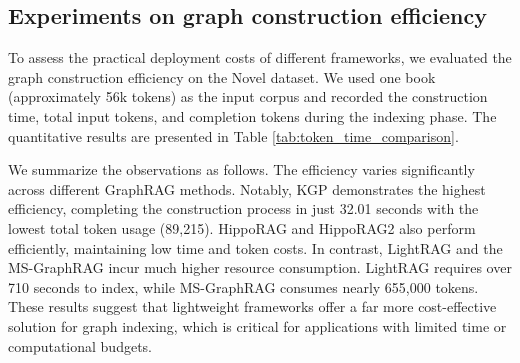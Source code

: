 \documentclass{article} %
\begin{document}
\begin{table}[t]
\centering
\caption{Construction time and all token usage during the indexing phase across different GraphRAG.}
\scriptsize
\label{tab:token_time_comparison}
\end{table}

\subsection{Experiments on graph construction efficiency}\label{sec:appendix_experiment_efficiency}
To assess the practical deployment costs of different frameworks, we evaluated the graph construction efficiency on the Novel dataset. We used one book (approximately 56k tokens) as the input corpus and recorded the construction time, total input tokens, and completion tokens during the indexing phase. The quantitative results are presented in Table \ref{tab:token_time_comparison}.

We summarize the observations as follows. The efficiency varies significantly across different GraphRAG methods. Notably, KGP demonstrates the highest efficiency, completing the construction process in just 32.01 seconds with the lowest total token usage (89,215). HippoRAG and HippoRAG2 also perform efficiently, maintaining low time and token costs. In contrast, LightRAG and the MS-GraphRAG incur much higher resource consumption. LightRAG requires over 710 seconds to index, while MS-GraphRAG consumes nearly 655,000 tokens. These results suggest that lightweight frameworks offer a far more cost-effective solution for graph indexing, which is critical for applications with limited time or computational budgets.
\end{document}
